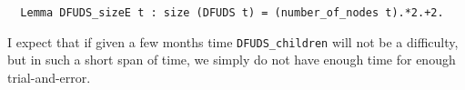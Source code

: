 \documentclass[11pt]{article}
\def\coqin#1{\texttt{#1}}
\begin{document}
\begin{verbatim}
  Lemma DFUDS_sizeE t : size (DFUDS t) = (number_of_nodes t).*2.+2.
\end{verbatim}

I expect that if given a few months time \coqin{DFUDS_children} will not be a difficulty, but in such a short span of time, we simply do not have enough time
for enough trial-and-error.



\end{document}
